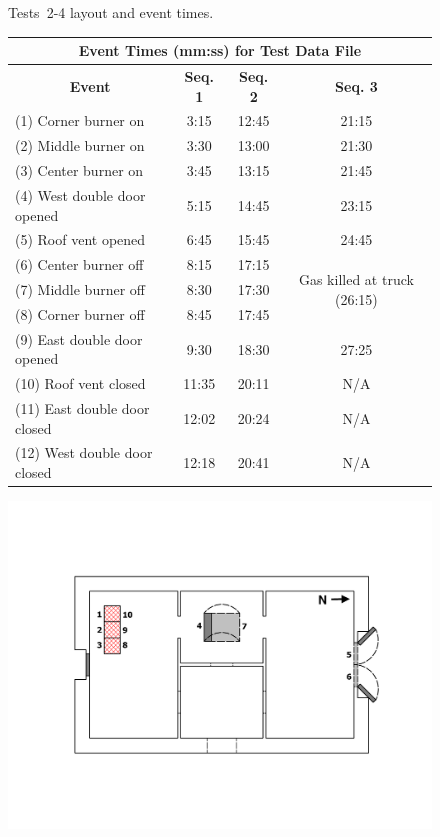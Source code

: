 \documentclass[12pt,oneside]{book}
\begin{document}
\begin{figure}[!ht]
\begin{minipage}[b]{0.9\columnwidth}
\end{minipage}
\caption{Tests~2-4 layout and event times.}
\label{fig:Tests_2-4_layout}
\end{figure}

\begin{figure}[!ht]
\begin{minipage}[b]{0.8\columnwidth}
	\begin{flushleft}
	\small
	\begin{tabular}{lccc}
	\multicolumn{4}{c}{\normalsize Event Times (mm:ss) for Test Data File} \\
	\toprule
	\multicolumn{1}{c}{\textbf{Event}} & \textbf{Seq. 1} & \textbf{Seq. 2} & \textbf{Seq. 3} \\
	\midrule
	(1)  Corner burner on 			&	3:15	&	12:45	&	21:15	\\
	(2)  Middle burner on 			&	3:30	&	13:00	&	21:30	\\
	(3)  Center burner on 			&	3:45	&	13:15	&	21:45	\\
	(4)  West double door opened 	&	5:15	&   14:45	&	23:15	\\
	(5)  Roof vent opened 			&	6:45	&	15:45 	&	24:45 	\\
	(6)  Center burner off 		 	&	8:15	&   17:15	&	\multirow{3}{*}{Gas killed at truck (26:15)} \\
	(7)  Middle burner off		 	&	8:30	&   17:30	&	\\
	(8)  Corner burner off 			&	8:45	&   17:45	&	\\
	(9)  East double door opened	&	9:30	&   18:30	&	27:25	\\
	(10) Roof vent closed 			&	11:35	&   20:11	&	N/A		\\
	(11) East double door closed	&	12:02 	&	20:24	&	N/A 	\\
	(12) West double door closed	&	12:18 	&	20:41	&	N/A		\\
	\bottomrule
	\end{tabular}
	\end{flushleft}
\end{minipage}
\begin{minipage}[b]{0.9\columnwidth}
	\vspace{15pt}
	\centering
	\includegraphics[width=\columnwidth]{../Figures/Floor_Plans/East_Structure_Test_5}

\end{minipage}
\end{figure}
\end{document}
